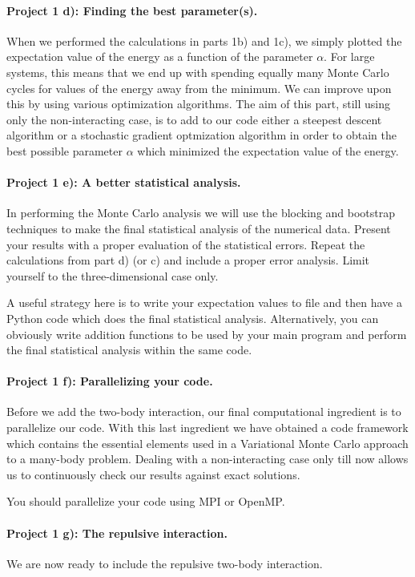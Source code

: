 \documentclass[%
oneside,                 %
final,                   %
10pt]{article}
\begin{document}
\paragraph{Project 1 d): Finding the best parameter(s).}
When we performed the calculations in parts 1b) and 1c), we simply
plotted the expectation value of the energy as a function of the
parameter $\alpha$. For large systems, this means that we end up with
spending equally many Monte Carlo cycles for values of the energy away
from the minimum. We can improve upon this by using various optimization algorithms.
The aim of this part, still using only the non-interacting case, is to add to our code either a steepest descent algorithm or a stochastic gradient optmization algorithm in order to obtain the best
possible parameter $\alpha$ which minimized the expectation value of the energy.

\paragraph{Project 1 e): A better statistical analysis.}
In performing the Monte Carlo analysis we will use the blocking and
  bootstrap techniques to make the final statistical analysis of the
  numerical data. Present your results with a proper evaluation of the
  statistical errors. Repeat the calculations from part  d) (or c)  and
  include a proper error analysis. Limit yourself to the
  three-dimensional case only.

A useful strategy here is to write your expectation values to file and
then have a Python code which does the final statistical
analysis. Alternatively, you can obviously write addition functions to
be used by your main program and perform the final statistical
analysis within the same code.

\paragraph{Project 1 f): Parallelizing your code.}
Before we add the two-body interaction, our final computational ingredient is to parallelize our code.
With this last ingredient we have obtained a code framework which contains the essential elements used in a Variational Monte Carlo approach to a many-body problem. Dealing with a non-interacting case only till now allows us to continuously check our results against exact solutions.

You should parallelize your code using MPI or OpenMP.

\paragraph{Project 1 g): The repulsive interaction.}
We are now ready to include the repulsive two-body interaction. 
\end{document}
